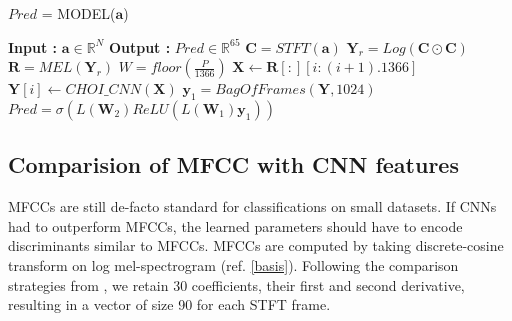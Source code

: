\begin{algorithm}
  \caption{$Pred$ = MODEL($\textbf{a}$) }\label{alg:cnnbow}
  \begin{algorithmic}[1]
    \Statex \textbf{Input :} $\textbf{a} \in \mathbb{R}^{N}$
    \Statex \textbf{Output :} $Pred \in \mathbb{R}^{65}$ 
    \State $\textbf{C} = STFT(\textbf{a})$ 
    \State $\textbf{Y}_{r} = Log(\textbf{C} \odot \textbf{C})$ 
    \State $\textbf{R} = MEL(\textbf{Y}_{r})$ 
    \State $W = floor(\frac{P}{1366})$
      \State $\textbf{X} \leftarrow \textbf{R}[:][i:(i+1).1366]$ 
      \State $\textbf{Y}[i] \leftarrow CHOI\_CNN(\textbf{X})$  
    \EndFor
    \State $\textbf{y}_{1} = BagOfFrames(\textbf{Y},1024)$ 
     \State $Pred = \sigma(L(\textbf{W}_{2})ReLU(L(\textbf{W}_{1})\textbf{y}_{1}))$ 
  \end{algorithmic}
\end{algorithm}
\FloatBarrier
    
\subsection{Comparision of MFCC with CNN features}    
\label{mfcc}  
MFCCs are still de-facto standard for classifications on small datasets. If CNNs had to outperform MFCCs, the learned parameters should have to encode discriminants similar to MFCCs. MFCCs are computed by taking discrete-cosine transform on log mel-spectrogram (ref. \ref{basis}). Following the comparison strategies from \cite{choi_cnn}, we retain 30 coefficients, their first and second derivative, resulting in a vector of size 90 for each STFT frame.
\bigskip

